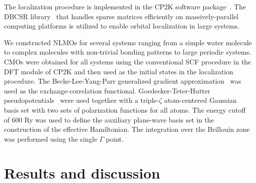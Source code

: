 \documentclass[aps,prl,reprint,amsmath,amssymb]{revtex4-1}
\begin{document}
The localization procedure is implemented in the CP2K software package~\cite{cp2kgeneral}. The DBCSR library~\cite{borstnik2014sparse} that handles sparse matrices efficiently on massively-parallel computing platforms is utilized to enable orbital localization in large systems.


We constructed NLMOs for several systems ranging from a simple water molecule to complex molecules with non-trivial bonding patterns to large periodic systems. 
CMOs were obtained for all systems using the conventional SCF procedure in the DFT module of CP2K and then used as the initial states in the localization procedure. 
The Becke-Lee-Yang-Parr generalized gradient approximation~\cite{becke1988density, lee1988development} was used as the exchange-correlation functional.
Goedecker-Teter-Hutter pseudopotentials~\cite{goedecker1996separable} were used together with a triple-$\zeta$ atom-centered Gaussian basis set with two sets of polarization functions for all atoms. 
The energy cutoff of 600 Ry 
was used to define the auxiliary plane-wave basis set in the construction of the effective Hamiltonian. 
The integration over the Brillouin zone was performed using the single $\Gamma$ point.


\section{Results and discussion}

\end{document}
